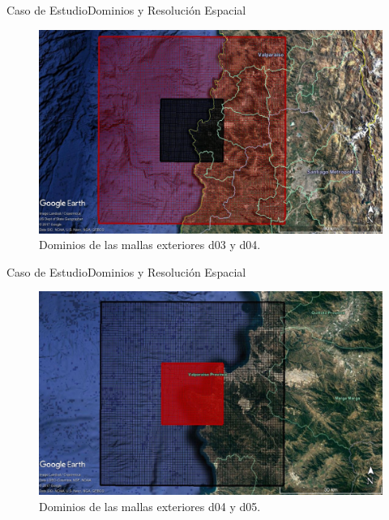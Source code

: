 \documentclass[mathserif]{beamer}
\begin{document}
\begin{frame}{Caso de Estudio}{Dominios y Resolución Espacial}
	\begin{figure}[H]
		\centering
		\includegraphics[width=0.95\linewidth]{d04d03}
		\caption{Dominios de las mallas exteriores d03 y d04.}
		\label{fig:0304}
	\end{figure}
\end{frame}

\begin{frame}{Caso de Estudio}{Dominios y Resolución Espacial}
	\begin{figure}[H]
		\centering
		\includegraphics[width=0.95\linewidth]{d03d02}
		\caption{Dominios de las mallas exteriores d04 y d05.}
		\label{fig:0405}
	\end{figure}
\end{frame}
\end{document}
